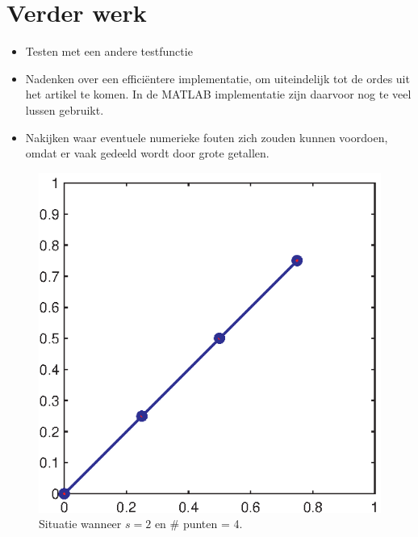 \documentclass[a4paper, 10pt]{article}
\begin{document}
\section{Verder werk}
\begin{itemize}
\item Testen met een andere testfunctie
\item Nadenken over een effici\"entere implementatie, om uiteindelijk tot de ordes uit het artikel te komen. In de MATLAB implementatie zijn daarvoor nog te veel lussen gebruikt.
\item Nakijken waar eventuele numerieke fouten zich zouden kunnen voordoen, omdat er vaak gedeeld wordt door grote getallen.
\end{itemize}

\begin{figure}[htp]
\centering
\includegraphics{img/2dimensions4points.eps}
\caption{Situatie wanneer $s=2$ en \# punten = 4.}
\label{fig:2dimensions4points}
\end{figure}
\end{document}
